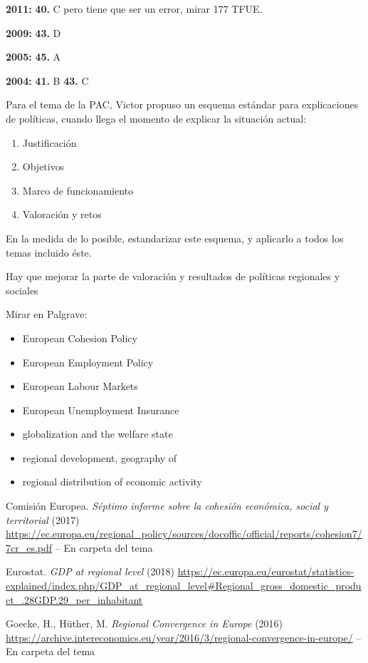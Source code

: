 \documentclass{nuevotema}
\begin{document}
\textbf{2011:} \textbf{40.} C pero tiene que ser un error, mirar 177 TFUE.

\textbf{2009:} \textbf{43.} D

\textbf{2005:} \textbf{45.} A

\textbf{2004:} \textbf{41.} B \textbf{43.} C

Para el tema de la PAC, Victor propuso un esquema estándar para explicaciones de políticas, cuando llega el momento de explicar la situación actual:
\begin{enumerate}
    \item Justificación
    \item Objetivos
    \item Marco de funcionamiento
    \item Valoración y retos
\end{enumerate}
En la medida de lo posible, estandarizar este esquema, y aplicarlo a todos los temas incluido éste.

Hay que mejorar la parte de valoración y resultados de políticas regionales y sociales

\bibliografia

Mirar en Palgrave:
\begin{itemize}
	\item European Cohesion Policy
	\item European Employment Policy
	\item European Labour Markets
	\item European Unemployment Insurance
	\item globalization and the welfare state
	\item regional development, geography of
	\item regional distribution of economic activity
\end{itemize}


Comisión Europea. \textit{Séptimo informe sobre la cohesión económica, social y territorial} (2017) \url{https://ec.europa.eu/regional_policy/sources/docoffic/official/reports/cohesion7/7cr_es.pdf} -- En carpeta del tema

Eurostat. \textit{GDP at regional level} (2018) \url{https://ec.europa.eu/eurostat/statistics-explained/index.php/GDP_at_regional_level#Regional_gross_domestic_product_.28GDP.29_per_inhabitant}

Goecke, H., Hüther, M. \textit{Regional Convergence in Europe} (2016) \url{https://archive.intereconomics.eu/year/2016/3/regional-convergence-in-europe/} -- En carpeta del tema
\end{document}
